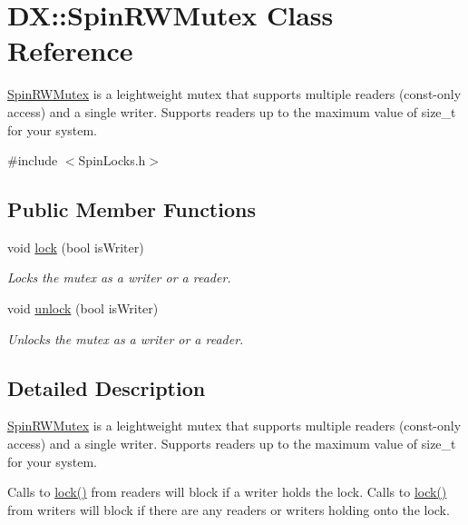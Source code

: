 \hypertarget{class_d_x_1_1_spin_r_w_mutex}{\section{D\-X\-:\-:Spin\-R\-W\-Mutex Class Reference}
\label{class_d_x_1_1_spin_r_w_mutex}
}


\hyperlink{class_d_x_1_1_spin_r_w_mutex}{Spin\-R\-W\-Mutex} is a leightweight mutex that supports multiple readers (const-\/only access) and a single writer. Supports readers up to the maximum value of size\-\_\-t for your system.  




{\ttfamily \#include $<$Spin\-Locks.\-h$>$}

\subsection*{Public Member Functions}
\begin{DoxyCompactItemize}
\item 
void \hyperlink{class_d_x_1_1_spin_r_w_mutex_ac2b4ebd8c8bd297c5e2d907c92c75a56}{lock} (bool is\-Writer)
\begin{DoxyCompactList}\small\item\em Locks the mutex as a writer or a reader. \end{DoxyCompactList}\item 
\hypertarget{class_d_x_1_1_spin_r_w_mutex_ac82ed966423779e8e021cf8a227ca4d9}{void \hyperlink{class_d_x_1_1_spin_r_w_mutex_ac82ed966423779e8e021cf8a227ca4d9}{unlock} (bool is\-Writer)}\label{class_d_x_1_1_spin_r_w_mutex_ac82ed966423779e8e021cf8a227ca4d9}

\begin{DoxyCompactList}\small\item\em Unlocks the mutex as a writer or a reader. \end{DoxyCompactList}\end{DoxyCompactItemize}


\subsection{Detailed Description}
\hyperlink{class_d_x_1_1_spin_r_w_mutex}{Spin\-R\-W\-Mutex} is a leightweight mutex that supports multiple readers (const-\/only access) and a single writer. Supports readers up to the maximum value of size\-\_\-t for your system. 

Calls to \hyperlink{class_d_x_1_1_spin_r_w_mutex_ac2b4ebd8c8bd297c5e2d907c92c75a56}{lock()} from readers will block if a writer holds the lock. Calls to \hyperlink{class_d_x_1_1_spin_r_w_mutex_ac2b4ebd8c8bd297c5e2d907c92c75a56}{lock()} from writers will block if there are any readers or writers holding onto the lock.


